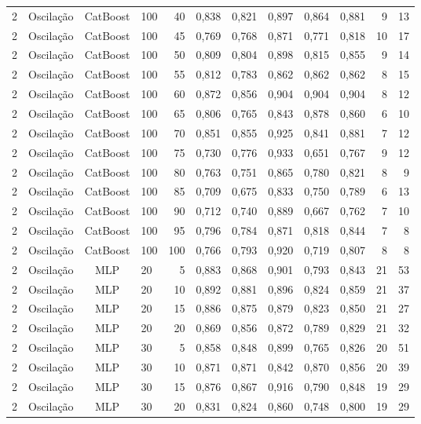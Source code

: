 \begin{longtable}{ccclrrrrrrrr}
2 & Oscilação & CatBoost & 100 & 40 & 0,838 & 0,821 & 0,897 & 0,864 & 0,881 & 9 & 13 \\
2 & Oscilação & CatBoost & 100 & 45 & 0,769 & 0,768 & 0,871 & 0,771 & 0,818 & 10 & 17 \\
2 & Oscilação & CatBoost & 100 & 50 & 0,809 & 0,804 & 0,898 & 0,815 & 0,855 & 9 & 14 \\
2 & Oscilação & CatBoost & 100 & 55 & 0,812 & 0,783 & 0,862 & 0,862 & 0,862 & 8 & 15 \\
2 & Oscilação & CatBoost & 100 & 60 & 0,872 & 0,856 & 0,904 & 0,904 & 0,904 & 8 & 12 \\
2 & Oscilação & CatBoost & 100 & 65 & 0,806 & 0,765 & 0,843 & 0,878 & 0,860 & 6 & 10 \\
2 & Oscilação & CatBoost & 100 & 70 & 0,851 & 0,855 & 0,925 & 0,841 & 0,881 & 7 & 12 \\
2 & Oscilação & CatBoost & 100 & 75 & 0,730 & 0,776 & 0,933 & 0,651 & 0,767 & 9 & 12 \\
2 & Oscilação & CatBoost & 100 & 80 & 0,763 & 0,751 & 0,865 & 0,780 & 0,821 & 8 & 9 \\
2 & Oscilação & CatBoost & 100 & 85 & 0,709 & 0,675 & 0,833 & 0,750 & 0,789 & 6 & 13 \\
2 & Oscilação & CatBoost & 100 & 90 & 0,712 & 0,740 & 0,889 & 0,667 & 0,762 & 7 & 10 \\
2 & Oscilação & CatBoost & 100 & 95 & 0,796 & 0,784 & 0,871 & 0,818 & 0,844 & 7 & 8 \\
2 & Oscilação & CatBoost & 100 & 100 & 0,766 & 0,793 & 0,920 & 0,719 & 0,807 & 8 & 8 \\
2 & Oscilação & MLP & 20 & 5 & 0,883 & 0,868 & 0,901 & 0,793 & 0,843 & 21 & 53 \\
2 & Oscilação & MLP & 20 & 10 & 0,892 & 0,881 & 0,896 & 0,824 & 0,859 & 21 & 37 \\
2 & Oscilação & MLP & 20 & 15 & 0,886 & 0,875 & 0,879 & 0,823 & 0,850 & 21 & 27 \\
2 & Oscilação & MLP & 20 & 20 & 0,869 & 0,856 & 0,872 & 0,789 & 0,829 & 21 & 32 \\
2 & Oscilação & MLP & 30 & 5 & 0,858 & 0,848 & 0,899 & 0,765 & 0,826 & 20 & 51 \\
2 & Oscilação & MLP & 30 & 10 & 0,871 & 0,871 & 0,842 & 0,870 & 0,856 & 20 & 39 \\
2 & Oscilação & MLP & 30 & 15 & 0,876 & 0,867 & 0,916 & 0,790 & 0,848 & 19 & 29 \\
2 & Oscilação & MLP & 30 & 20 & 0,831 & 0,824 & 0,860 & 0,748 & 0,800 & 19 & 29 \\

\end{longtable}
